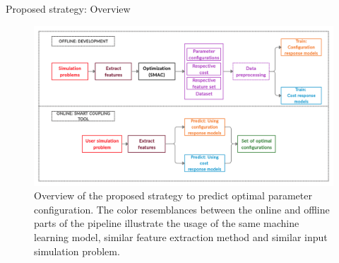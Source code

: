 \documentclass[10pt]{beamer}
\begin{document}
\begin{frame}{Proposed strategy: Overview}

\begin{figure}[h!]
\centering
\includegraphics[width=1\linewidth,height=0.7\textheight]{images/Processflow.jpg}
\caption{Overview of the proposed strategy to predict optimal parameter configuration. The color resemblances between the online and offline parts of the pipeline illustrate the usage of the same machine learning model, similar feature extraction method and similar input simulation problem.}
\label{fig:proposedsolution}
\end{figure}  
	
\end{frame}
\end{document}
